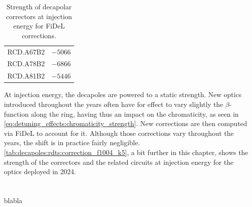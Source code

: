 \begin{table}
\begin{tabular}{lr}
        \hspace{2mm}RCD.A67B2 & $-5066$ \\
        \hspace{2mm}RCD.A78B2 & $-6866$ \\
        \hspace{2mm}RCD.A81B2 & $-5446$ \\
        \bottomrule
    \end{tabular}
    \caption{Strength of decapolar correctors at injection energy for FiDeL corrections.}
    \label{tab:decapoles:strength_rcd_fidel}
\end{table}

At injection energy, the decapoles are powered to a static strength. New optics introduced
throughout the years often have for effect to vary slightly the $\beta$-function along the ring,
having thus an impact on the chromaticity, as seen in
\cref{eq:detuning_effects:chromaticity_strength}. New corrections are then computed via FiDeL to
account for it.
Although those corrections vary throughout the years, the shift is in practice fairly negligible.
\cref{tab:decapoles:rdts:correction_f1004_k5}, a bit further in this chapter, shows the strength of
the correctors and the related circuits at injection energy for the optics deployed in 2024.



















\section{}

blabla